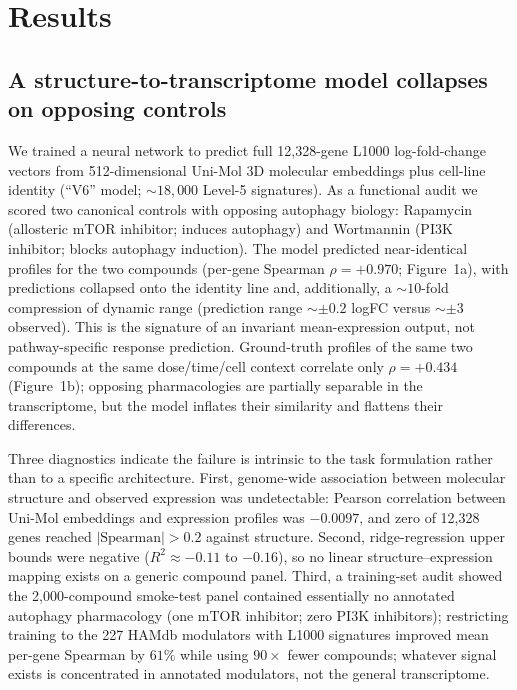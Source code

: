 \documentclass[11pt]{article}
\newcommand{\rpm}{\ensuremath{\rho}}
\begin{document}
\section*{Results}

\subsection*{A structure-to-transcriptome model collapses on opposing controls}

We trained a neural network to predict full 12{,}328-gene L1000
log-fold-change vectors from 512-dimensional Uni-Mol 3D molecular embeddings
plus cell-line identity (``V6'' model; ${\sim}18{,}000$ Level-5 signatures).
As a functional audit we scored two canonical controls with opposing autophagy
biology: Rapamycin (allosteric mTOR inhibitor; induces autophagy) and
Wortmannin (PI3K inhibitor; blocks autophagy induction). The model predicted
near-identical profiles for the two compounds (per-gene Spearman
$\rpm=+0.970$; Figure~1a), with predictions collapsed onto the identity line
and, additionally, a ${\sim}10$-fold compression of dynamic range
(prediction range ${\sim}\pm0.2$ logFC versus ${\sim}\pm3$ observed). This is
the signature of an invariant mean-expression output, not pathway-specific
response prediction. Ground-truth profiles of the same two compounds at the
same dose/time/cell context correlate only $\rpm=+0.434$
(Figure~1b); opposing pharmacologies are partially separable in the
transcriptome, but the model inflates their similarity and flattens their
differences.

Three diagnostics indicate the failure is intrinsic to the task formulation
rather than to a specific architecture. First, genome-wide association between
molecular structure and observed expression was undetectable: Pearson
correlation between Uni-Mol embeddings and expression profiles was $-0.0097$,
and zero of 12{,}328 genes reached $|\textrm{Spearman}|>0.2$ against
structure. Second, ridge-regression upper bounds were negative
($R^2\approx-0.11$ to $-0.16$), so no linear structure--expression mapping
exists on a generic compound panel. Third, a training-set audit showed the
2{,}000-compound smoke-test panel contained essentially no annotated autophagy
pharmacology (one mTOR inhibitor; zero PI3K inhibitors); restricting training
to the 227 HAMdb modulators with L1000 signatures improved mean per-gene
Spearman by $61\%$ while using $90\times$ fewer compounds; whatever signal
exists is concentrated in annotated modulators, not the general transcriptome.
\end{document}
